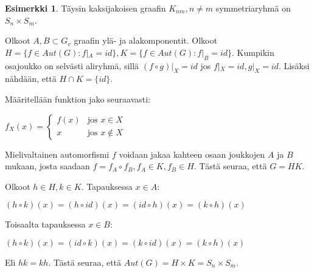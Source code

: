 \documentclass[a4paper, 12pt]{article}
\theoremstyle{definition}
\newtheorem{example}[mydef]{Esimerkki}
\theoremstyle{plain}
\begin{document}
\begin{example}
\label{example:k_nm}
Täysin kaksijakoisen graafin $K_{nm}, n \neq m$ symmetriaryhmä on $S_n \times S_m$.

\begin{center}
\end{center}

Olkoot $A, B \subset G_v$ graafin ylä- ja alakomponentit. Olkoot $H = \{f \in Aut(G) : f|_A = id\}, K = \{f \in Aut(G) : f|_B = id\}$. Kumpikin osajoukko on selvästi aliryhmä, sillä $(f \circ g)|_X = id$ jos $f|_X = id, g|_X = id$. Lisäksi nähdään, että $H \cap K = \{ id \}$.

Määritellään funktion jako seuraavasti:

\begin{center}
\begin{math}
f_X(x) =
\left\{
	\begin{array}{ll}
		f(x)  & \mbox{jos } x \in X \\
		x & \mbox{jos } x \notin X
	\end{array}
\right.
\end{math}
\end{center}

Mielivaltainen automorfismi $f$ voidaan jakaa kahteen osaan joukkojen $A$ ja $B$ mukaan, josta saadaan $f = f_A \circ f_B, f_A \in K, f_B \in H$. Tästä seuraa, että $G = HK$.

Olkoot $h \in H, k \in K$. Tapauksessa $x \in A$:
\begin{center}
\begin{math}
(h \circ k)(x) = (h \circ id)(x) = (id \circ h)(x) = (k \circ h)(x)
\end{math}
\end{center}
Toisaalta tapauksessa $x \in B$:
\begin{center}
\begin{math}
(h \circ k)(x) = (id \circ k)(x) = (k \circ id)(x) = (k \circ h)(x)
\end{math}
\end{center}

Eli $hk = kh$. Tästä seuraa, että $Aut(G) = H \times K = S_n \times S_m$.
\end{example}
\end{document}

